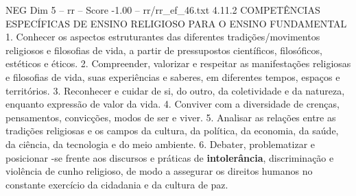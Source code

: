 \begin{textsample}{NEG Dim 5 – rr – Score -1.00 – rr/rr\_ef\_46.txt}  \label{ex:f5_neg_067}
4.11.2 COMPETÊNCIAS ESPECÍFICAS DE ENSINO RELIGIOSO PARA O ENSINO FUNDAMENTAL 1.
Conhecer os aspectos estruturantes das diferentes tradições/movimentos religiosos e filosofias de vida, a partir de pressupostos científicos, filosóficos, estéticos e éticos. 2.
Compreender, valorizar e respeitar as manifestações religiosas e filosofias de vida, suas experiências e saberes, em diferentes tempos, espaços e territórios. 3.
Reconhecer e cuidar de si, do outro, da coletividade e da natureza, enquanto expressão de valor da vida. 4.
Conviver com a diversidade de crenças, pensamentos, convicções, modos de ser e viver. 5.
Analisar as relações entre as tradições religiosas e os campos da cultura, da política, da economia, da saúde, da ciência, da tecnologia e do meio ambiente. 6.
Debater, problematizar e posicionar -se frente aos discursos e práticas de \textbf{intolerância}, discriminação e violência de cunho religioso, de modo a assegurar os direitos humanos no constante exercício da cidadania e da cultura de paz.

\end{textsample}
